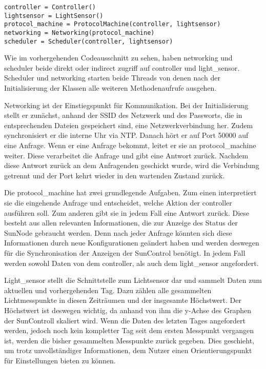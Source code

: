 \begin{lstlisting}[caption={Initialisierungen in main}, captionpos=b, label={lst:tf_graph_save}]
controller = Controller()
lightsensor = LightSensor()
protocol_machine = ProtocolMachine(controller, lightsensor)
networking = Networking(protocol_machine)
scheduler = Scheduler(controller, lightsensor)
\end{lstlisting}

Wie im vorhergehenden Codeausschnitt zu sehen, haben \glqq networking\grqq{} und \glqq scheduler\grqq{} beide direkt oder indirect zugriff auf \glqq controller\grqq{} und \glqq light\_sensor\grqq{}. Scheduler und networking starten beide Threads von denen nach der Initialisierung der Klassen alle weiteren Methodenaufrufe ausgehen.

Networking ist der Einstiegspunkt für Kommunikation. Bei der Initialisierung stellt er zunächst, anhand der SSID des Netzwerk und des Passworts, die in entsprechenden Dateien gespeichert sind, eine Netzwerkverbindung her. Zudem synchronisiert er die interne Uhr via NTP. Danach hört er auf Port 50000 auf eine Anfrage. Wenn er eine Anfrage bekommt, leitet er sie an protocol\_machine weiter. Diese verarbeitet die Anfrage und gibt eine Antwort zurück. Nachdem diese Antwort zurück an dem Anfragenden geschickt wurde, wird die Verbindung getrennt und der Port kehrt wieder in den wartenden Zustand zurück.

Die protocol\_machine hat zwei grundlegende Aufgaben. Zum einen interpretiert sie die eingehende Anfrage und entscheidet, welche Aktion der controller ausführen soll. Zum anderen gibt sie in jedem Fall eine Antwort zurück. Diese besteht aus allen relevanten Informationen, die zur Anzeige des Status der SunNode gebraucht werden. Denn nach jeder Anfrage könnten sich diese Informationen durch neue Konfigurationen geändert haben und werden deswegen für die Synchronisation der Anzeigen der SunControl benötigt. In jedem Fall werden sowohl Daten von dem controller, als auch dem light\_sensor angefordert.

Light\_sensor stellt die Schnittstelle zum Lichtsensor dar und sammelt Daten zum aktuellen und vorhergehenden Tag. Dazu zählen alle gesammelten Lichtmesspunkte in diesen Zeiträumen und der insgesamte Höchstwert. Der Höchstwert ist deswegen wichtig, da anhand von ihm die y-Achse des Graphen der SunControll skaliert wird. Wenn die Daten des letzten Tages angefordert werden, jedoch noch kein kompletter Tag seit dem ersten Messpunkt vergangen ist, werden die bisher gesammelten Messpunkte zurück gegeben. Dies geschieht, um trotz unvollständiger Informationen, dem Nutzer einen Orientierungspunkt für Einstellungen bieten zu können.

